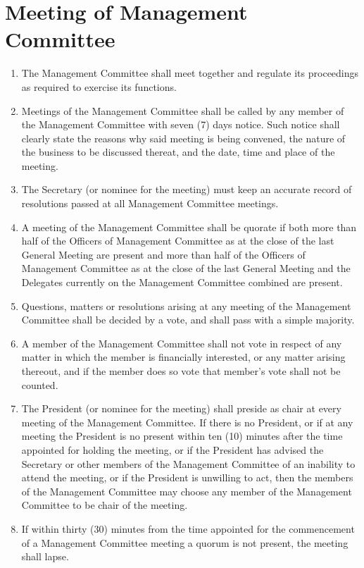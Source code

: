 \documentclass[a4paper]{article}
\begin{document}
\section{Meeting of Management Committee}
\begin{enumerate}
\item The Management Committee shall meet together and regulate its proceedings as required to exercise its functions.
\item Meetings of the Management Committee shall be called by any member of the Management Committee with seven (7) days notice. Such notice shall clearly state the reasons why said meeting is being convened, the nature of the business to be discussed thereat, and the date, time and place of the meeting.
\item The Secretary (or nominee for the meeting) must keep an accurate record of resolutions passed at all Management Committee meetings.
\item A meeting of the Management Committee shall be quorate if both more than half of the Officers of Management Committee as at the close of the last General Meeting are present and more than half of the Officers of Management Committee as at the close of the last General Meeting and the Delegates  currently on the Management Committee combined are present.
\item Questions, matters or resolutions arising at any meeting of the Management Committee shall be decided by a vote, and shall pass with a simple majority.
\item A member of the Management Committee shall not vote in respect of any matter in which the member is financially interested, or any matter arising thereout, and if the member does so vote that member's vote shall not be counted.
\item The President (or nominee for the meeting) shall preside as chair at every meeting of the Management Committee. If there is no President, or if at any meeting the President is no present within ten (10) minutes after the time appointed for holding the meeting, or if the President has advised the Secretary or other members of the Management Committee of an inability to attend the meeting, or if the President is unwilling to act, then the members of the Management Committee may choose any member of the Management Committee to be chair of the meeting.
\item If within thirty (30) minutes from the time appointed for the commencement of a Management Committee meeting a quorum is not present, the meeting shall lapse.
\end{enumerate}
\end{document}
